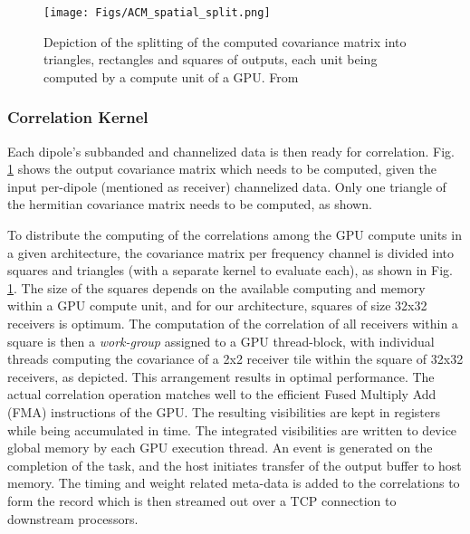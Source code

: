 \documentclass{ws-jai}
\begin{document}
\begin{figure}[htbp]
\centering
\texttt{[image: Figs/ACM\_spatial\_split.png]}
\caption  {Depiction of  the splitting  of the  computed covariance  matrix into
  triangles, rectangles  and squares of outputs,  each unit being computed  by a
  compute unit of a GPU. From \cite{romein2016comparison}}
\label{fig:acm_spatial_split}
\end{figure}

\subsubsection {Correlation Kernel}
Each  dipole's subbanded  and channelized  data is  then ready  for correlation.
Fig.  \ref{fig:acm_spatial_split} shows the output covariance matrix which needs
to be computed,  given the input per-dipole (mentioned  as receiver) channelized
data. Only one triangle of the hermitian covariance matrix needs to be computed,
as shown.

To distribute the computing of the correlations among the GPU compute units in a
given architecture, the covariance matrix  per frequency channel is divided into
squares and  triangles (with a  separate kernel to  evaluate each), as  shown in
Fig.   \ref{fig:acm_spatial_split}.  The  size  of the  squares  depends on  the
available  computing  and  memory  within  a  GPU  compute  unit,  and  for  our
architecture, squares of size 32x32 receivers is optimum. The computation of the
correlation of  all receivers  within a  square is  then a  \textit {work-group}
assigned to a GPU thread-block, with individual threads computing the covariance
of a 2x2 receiver tile within the  square of 32x32 receivers, as depicted.  This
arrangement results  in optimal  performance.  The actual  correlation operation
matches well to the efficient Fused  Multiply Add (FMA) instructions of the GPU.
The  resulting visibilities  are kept  in registers  while being  accumulated in
time.  The integrated  visibilities are written to device global  memory by each
GPU execution thread.  An event is generated  on the completion of the task, and
the host initiates transfer of the output buffer to host memory.  The timing and
weight related meta-data  is added to the correlations to  form the record which
is then streamed out over a TCP connection to downstream processors.\\
\end{document}
